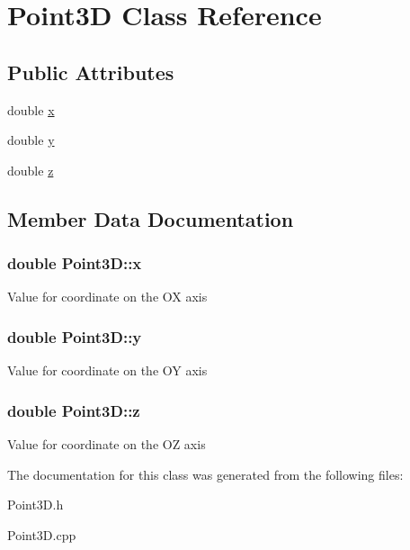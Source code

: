 \hypertarget{classPoint3D}{\section{Point3\-D Class Reference}
\label{classPoint3D}
}
\subsection*{Public Attributes}
\begin{DoxyCompactItemize}
\item 
double \hyperlink{classPoint3D_abf9d1f564d599503cdb114934c7044b7}{x}
\item 
double \hyperlink{classPoint3D_abcb44b06e310b076fa9d65dec8541dd4}{y}
\item 
double \hyperlink{classPoint3D_a9f4a32e3afccb3c9fe9b5cd88e179c3d}{z}
\end{DoxyCompactItemize}


\subsection{Member Data Documentation}
\hypertarget{classPoint3D_abf9d1f564d599503cdb114934c7044b7}{
\subsubsection[{x}]{\setlength{\rightskip}{0pt plus 5cm}double Point3\-D\-::x}}\label{classPoint3D_abf9d1f564d599503cdb114934c7044b7}
Value for coordinate on the O\-X axis \hypertarget{classPoint3D_abcb44b06e310b076fa9d65dec8541dd4}{
\subsubsection[{y}]{\setlength{\rightskip}{0pt plus 5cm}double Point3\-D\-::y}}\label{classPoint3D_abcb44b06e310b076fa9d65dec8541dd4}
Value for coordinate on the O\-Y axis \hypertarget{classPoint3D_a9f4a32e3afccb3c9fe9b5cd88e179c3d}{
\subsubsection[{z}]{\setlength{\rightskip}{0pt plus 5cm}double Point3\-D\-::z}}\label{classPoint3D_a9f4a32e3afccb3c9fe9b5cd88e179c3d}
Value for coordinate on the O\-Z axis 

The documentation for this class was generated from the following files\-:\begin{DoxyCompactItemize}
\item 
Point3\-D.\-h\item 
Point3\-D.\-cpp\end{DoxyCompactItemize}
